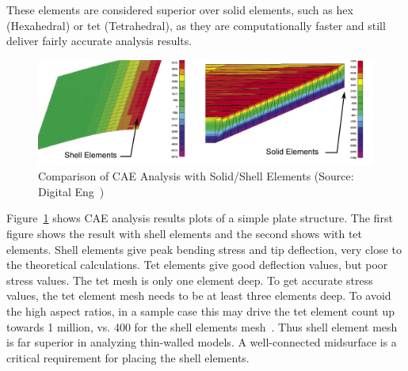 These elements are considered superior over solid elements, such as hex (Hexahedral) or tet (Tetrahedral), as they are computationally faster and still deliver fairly accurate analysis results. 

\begin{figure} [!h]
\centering
\includegraphics[width=\linewidth]{images/solidshelldesk_1.pdf}
\caption{Comparison of CAE Analysis with Solid/Shell Elements (Source: Digital Eng~\cite{Abbey2013})}
\label{fig:introduction:solidshell}
\end{figure}
	

Figure~\ref{fig:introduction:solidshell}  shows CAE analysis results plots of a simple plate structure. The first figure shows the result with shell elements and the second shows with tet elements. Shell elements give peak bending stress and tip deflection, very close to the theoretical calculations. Tet elements give good deflection values, but poor stress values. The tet mesh is only one element deep. To get accurate stress values, the tet element mesh needs to be at least three elements deep. To avoid the high aspect ratios, in a sample case this may drive the tet element count up towards 1 million, vs. 400 for the shell elements mesh~\cite{Abbey2013}. Thus shell element mesh is far superior in analyzing thin-walled models. A well-connected midsurface is a critical requirement for placing the shell elements.

